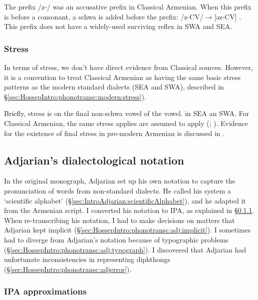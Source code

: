 The prefix /z-/ was an accusative prefix in Classical Armenian. When this prefix is before a consonant, a schwa is added before the prefix: /z-CV/$\rightarrow$[əz-CV] \citep[116]{Thomson-1989-IntroClassicalArmenian}. This prefix does not have a widely-used surviving reflex in SWA and SEA.


\subsubsection{Stress}\label{sec:HossepIntro:phonotransc:CA:stress}

 
In terms of stress, we don't have direct evidence from Classical sources. However, it is a convention to treat Classical Armenian as having the same basic stress patterns as the modern standard dialects (SEA and SWA), described in \S\ref{sec:HossepIntro:phonotransc:modern:stress}). 

Briefly, stress  is on the final non-schwa vowel of the vowel. in SEA an SWA. For Classical Armenian, the same stress applies are assumed to apply (\citealt[15]{Thomson-1989-IntroClassicalArmenian}; \citealt[1043-4]{Macak-2017-PhonoClassicalArmenian}). Evidence for the existence of final stress in pre-modern Armenian is discussed in \citet{DeLisi-2018-ArmenianProsodyDiachrony}.





\subsection{Adjarian's dialectological notation }\label{sec:HossepIntro:phonotransc:adj}


In the original monograph, Adjarian set up his own notation to capture the pronunciation of words from  non-standard dialects. He called his system a `scientific alphabet'  (\S\ref{sec:IntroAdjarian:scientificAlphabet}), and he adapted it from the Armenian script. I converted his notation to IPA, as explained in \S\ref{sec:HossepIntro:phonotransc:adj:ipa}. When re-transcribing his notation, I had to make decisions on matters that Adjarian kept implicit (\S\ref{sec:HossepIntro:phonotransc:adj:implicit}). I sometimes had to diverge from Adjarian's notation because of   typographic problems (\S\ref{sec:HossepIntro:phonotransc:adj:typograph}). I discovered that Adjarian had unfortunate inconsistencies in representing diphthongs (\S\ref{sec:HossepIntro:phonotransc:adjerror}). 


\subsubsection{IPA approximations}\label{sec:HossepIntro:phonotransc:adj:ipa}

